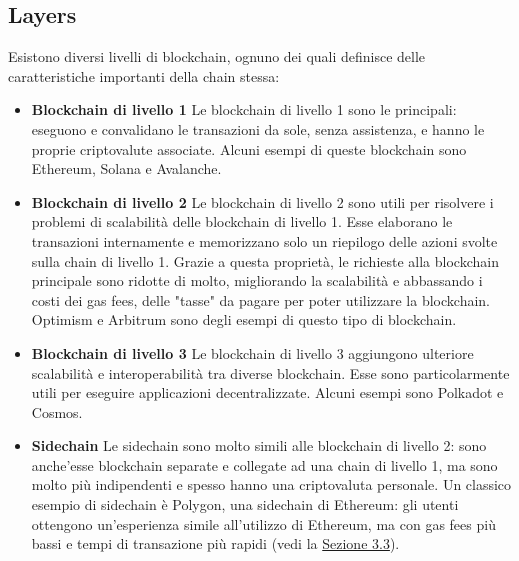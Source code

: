 \documentclass[12pt]{report}
\begin{document}
\subsection{Layers}
Esistono diversi livelli di blockchain, ognuno dei quali definisce delle caratteristiche importanti della chain stessa:
\begin{itemize}[topsep=5pt, itemsep=0pt]
    \item \textbf{Blockchain di livello 1}\newline
    Le blockchain di livello 1 sono le principali: eseguono e convalidano le transazioni da sole, senza assistenza, e hanno le proprie criptovalute associate.\newline
    Alcuni esempi di queste blockchain sono Ethereum, Solana e Avalanche.
    \item \textbf{Blockchain di livello 2}\newline
    Le blockchain di livello 2 sono utili per risolvere i problemi di scalabilità delle blockchain di livello 1. Esse elaborano le transazioni internamente e memorizzano solo un riepilogo delle azioni svolte sulla chain di livello 1.\newline
    Grazie a questa proprietà, le richieste alla blockchain principale sono ridotte di molto, migliorando la scalabilità e abbassando i costi dei gas fees, delle "tasse" da pagare per poter utilizzare la blockchain.\newline
    Optimism e Arbitrum sono degli esempi di questo tipo di blockchain.
    \item \textbf{Blockchain di livello 3}\newline
    Le blockchain di livello 3 aggiungono ulteriore scalabilità e interoperabilità tra diverse blockchain. Esse sono particolarmente utili per eseguire applicazioni decentralizzate.\newline
    Alcuni esempi sono Polkadot e Cosmos.
    \item \textbf{Sidechain}\newline
    Le sidechain sono molto simili alle blockchain di livello 2: sono anche'esse blockchain separate e collegate ad una chain di livello 1, ma sono molto più indipendenti e spesso hanno una criptovaluta personale.\newline
    Un classico esempio di sidechain è Polygon, una sidechain di Ethereum: gli utenti ottengono un'esperienza simile all'utilizzo di Ethereum, ma con gas fees più bassi e tempi di transazione più rapidi (vedi la \hyperref[sec:polygon]{Sezione 3.3}). \cite{Quattro}\newpage
\end{itemize}
\end{document}
